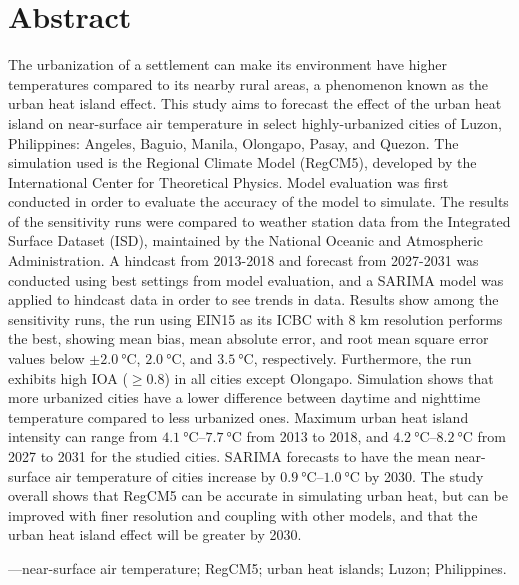 \chapter*{Abstract}

The urbanization of a settlement can make its environment have higher temperatures compared to its nearby rural areas,
	a phenomenon known as the urban heat island effect.
This study aims to forecast the effect of the urban heat island on near-surface air temperature in select highly-urbanized cities of Luzon, Philippines: Angeles, Baguio, Manila, Olongapo, Pasay, and Quezon.
The simulation used is the Regional Climate Model (RegCM5), developed by the International Center for Theoretical Physics.
Model evaluation was first conducted in order to evaluate the accuracy of the model to simulate.
The results of the sensitivity runs were compared to weather station data from the Integrated Surface Dataset (ISD), maintained by the National Oceanic and Atmospheric Administration.
A hindcast from 2013-2018 and forecast from 2027-2031 was conducted using best settings from model evaluation, and a SARIMA model was applied to hindcast data in order to see trends in data.
Results show among the sensitivity runs, the run using EIN15 as its ICBC with 8 km resolution performs the best, showing mean bias, mean absolute error, and root mean square error values below $\pm \qty{2.0}{\degreeCelsius}$, $\qty{2.0}{\degreeCelsius}$, and $\qty{3.5}{\degreeCelsius}$, respectively.
Furthermore, the run exhibits high IOA ($\geq \num{0.8}$) in all cities except Olongapo.
Simulation shows that more urbanized cities have a lower difference between daytime and nighttime temperature compared to less urbanized ones.
Maximum urban heat island intensity can range from
$\qtyrange{4.1}{7.7}{\degreeCelsius}$ from 2013 to 2018, and
$\qtyrange{4.2}{8.2}{\degreeCelsius}$ from 2027 to 2031 for the studied cities.
SARIMA forecasts to have the mean near-surface air temperature of cities increase by $\qtyrange{0.9}{1.0}{\degreeCelsius}$ by 2030.
The study overall shows that RegCM5 can be accurate in simulating urban heat, but can be improved with finer resolution and coupling with other models, and that 
the urban heat island effect will be greater by 2030.

\vspace{3ex} ---near-surface air temperature; RegCM5; urban heat islands; Luzon; Philippines.

%

